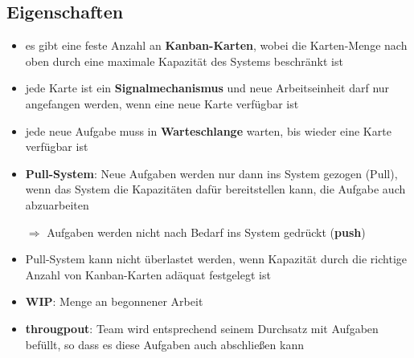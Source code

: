 \subsection{Eigenschaften}
\begin{itemize}
  \item es gibt eine feste Anzahl an \textbf{Kanban-Karten},  wobei die Karten-Menge nach oben durch
    eine maximale Kapazität des Systems beschränkt ist
  \item jede Karte ist ein \textbf{Signalmechanismus} und neue Arbeitseinheit darf nur angefangen
    werden, wenn eine neue Karte verfügbar ist
  \item jede neue Aufgabe muss in \textbf{Warteschlange} warten, bis wieder eine Karte verfügbar ist
  \item \textbf{Pull-System}: Neue Aufgaben werden nur dann ins System gezogen (Pull), wenn das
    System die Kapazitäten dafür bereitstellen kann, die Aufgabe auch abzuarbeiten

    $\Rightarrow$  Aufgaben werden nicht nach Bedarf ins System gedrückt (\textbf{push})
  \item Pull-System kann nicht überlastet werden, wenn Kapazität durch die richtige Anzahl von
    Kanban-Karten adäquat festgelegt ist
  \item \textbf{WIP}: Menge an begonnener Arbeit
  \item \textbf{througpout}: Team wird entsprechend seinem Durchsatz mit Aufgaben befüllt, so dass
    es diese Aufgaben auch abschließen kann
\end{itemize}


